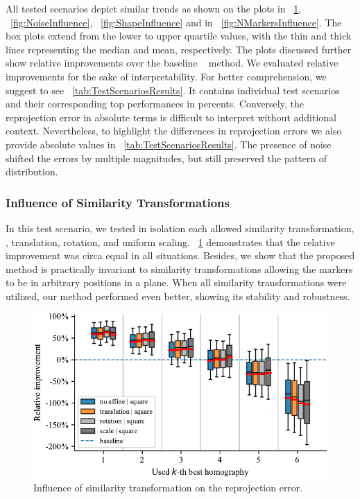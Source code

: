 All tested scenarios depict similar trends as shown on the plots in \figtext{}~\ref{fig:SimilarityTransformInfluence}, \figtext{}~\ref{fig:NoiseInfluence}, \figtext{}~\ref{fig:ShapeInfluence} and in \figtext{}~\ref{fig:NMarkersInfluence}. The box plots extend from the lower to upper quartile values, with the thin and thick lines representing the median and mean, respectively. The plots discussed further show relative improvements over the baseline \opencv{}~\cite{bradski2008learning} method. We evaluated relative improvements for the sake of interpretability. For better comprehension, we suggest to see \tabletext{}~\ref{tab:TestScenariosResults}. It contains individual test scenarios and their corresponding top performances in percents. Conversely, the reprojection error in absolute terms is difficult to interpret without additional context. Nevertheless, to highlight the differences in reprojection errors we also provide absolute values in \tabletext{}~\ref{tab:TestScenariosResults}. The presence of noise shifted the errors by multiple magnitudes, but still preserved the pattern of distribution.

\subsubsection{Influence of Similarity Transformations}

In this test scenario, we tested in isolation each allowed similarity transformation, \ietext{}, translation, rotation, and uniform scaling. \figtext{}~\ref{fig:SimilarityTransformInfluence} demonstrates that the relative improvement was circa equal in all situations. Besides, we show that the proposed method is practically invariant to similarity transformations allowing the markers to be in arbitrary positions in a plane. When all similarity transformations were utilized, our method performed even better, showing its stability and robustness.

\def\boxplotimgwidth{0.75\linewidth}

\begin{figure}[t]
    \centering
    \includegraphics[width=\boxplotimgwidth]{figures/homography/similarity_transform_influence.pdf}
    \caption[Influence of similarity transformation]{Influence of similarity transformation on the reprojection error.}
    \label{fig:SimilarityTransformInfluence}
\end{figure}

